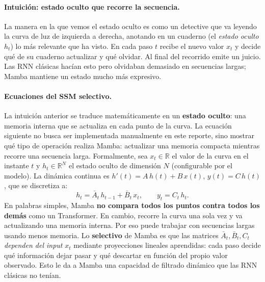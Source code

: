 \documentclass[11pt,a4paper]{article}
\begin{document}
\paragraph{Intuición: estado oculto que recorre la secuencia.}
La manera en la que vemos el estado oculto es como un detective que va leyendo la curva de luz de izquierda a
derecha, anotando en un cuaderno
(el \textit{estado oculto} $h_t$) lo más relevante que ha visto.
En cada paso $t$ recibe el nuevo valor $x_t$ y decide qué de su
cuaderno actualizar y qué olvidar. Al final del recorrido emite un
juicio. Las RNN clásicas hacían esto pero olvidaban demasiado en
secuencias largas; Mamba mantiene un estado mucho más expresivo.

\paragraph{Ecuaciones del SSM selectivo.}
La intuición anterior se traduce matemáticamente en un \textbf{estado
oculto}: una memoria interna que se actualiza en cada punto de la
curva. La ecuación siguiente no busca ser implementada manualmente
en este reporte, sino mostrar qué tipo de operación realiza Mamba:
actualizar una memoria compacta mientras recorre una secuencia
larga. Formalmente, sea $x_t \in \mathbb{R}$ el valor de la curva
en el instante $t$ y $h_t \in \mathbb{R}^N$ el estado oculto de
dimensión $N$ (configurable por el modelo). La dinámica continua
es $h'(t) = A\,h(t) + B\,x(t)$, $y(t) = C\,h(t)$, que se discretiza
a:
\begin{equation}
h_t = \bar{A}_t\,h_{t-1} + \bar{B}_t\,x_t,
\qquad
y_t = C_t\,h_t.
\label{eq:ssm}
\end{equation}
En palabras simples, Mamba \textbf{no compara todos los puntos
contra todos los demás} como un Transformer. En cambio, recorre la
curva una sola vez y va actualizando una memoria interna. Por eso
puede trabajar con secuencias largas usando menos memoria. Lo
\textbf{selectivo} de Mamba es que las matrices
$\bar{A}_t, \bar{B}_t, C_t$ \textit{dependen del input} $x_t$
mediante proyecciones lineales aprendidas: cada paso decide qué
información dejar pasar y qué descartar en función del propio valor
observado. Esto le da a Mamba una capacidad de filtrado dinámico
que las RNN clásicas no tenían.
\end{document}
